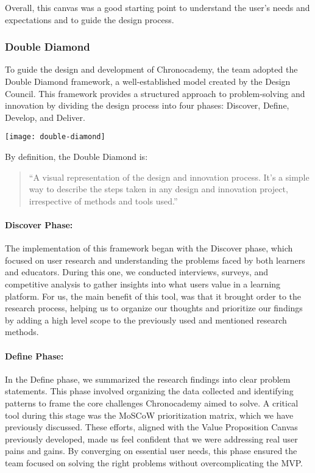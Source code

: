 Overall, this canvas was a good starting point to understand the user's needs and expectations and to guide the design process.

\subsubsection{Double Diamond}\label{subsubsec:double-diamond}
To guide the design and development of Chronocademy, the team adopted the Double Diamond framework, a well-established model created by the Design Council.
This framework provides a structured approach to problem-solving and innovation by dividing the design process into four phases: Discover, Define, Develop, and Deliver.

\begin{center}
    \texttt{[image: double-diamond]}
\end{center}
By definition, the Double Diamond is:
\begin{quote}
    ``A visual representation of the design and innovation process.
    It’s a simple way to describe the steps taken in any design and innovation project, irrespective of methods and tools used.''~\cite{doubleDiamond}
\end{quote}


\paragraph{Discover Phase:}
The implementation of this framework began with the Discover phase, which focused on user research and understanding the problems faced by both learners and educators.
During this one, we conducted interviews, surveys, and competitive analysis to gather insights into what users value in a learning platform.
For us, the main benefit of this tool, was that it brought order to the research process, helping us to organize our thoughts and prioritize our findings by adding a high level scope to the previously used and mentioned research methods.\newline
\paragraph{Define Phase:}
In the Define phase, we summarized the research findings into clear problem statements.
This phase involved organizing the data collected and identifying patterns to frame the core challenges Chronocademy aimed to solve.
A critical tool during this stage was the MoSCoW prioritization matrix, which we have previously discussed.
These efforts, aligned with the Value Proposition Canvas previously developed, made us feel confident that we were addressing real user pains and gains.
By converging on essential user needs, this phase ensured the team focused on solving the right problems without overcomplicating the MVP\@.\newline
